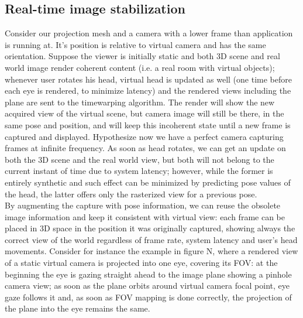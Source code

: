 \subsection{Real-time image stabilization}
Consider our projection mesh and a camera with a lower frame than application is running at. It's position is relative to virtual camera and has the same orientation. Suppose the viewer is initially static and both 3D scene and real world image render coherent content (i.e. a real room with virtual objects); whenever user rotates his head, virtual head is updated as well (one time before each eye is rendered, to minimize latency) and the rendered views including the plane are sent to the timewarping algorithm. The render will show the new acquired view of the virtual scene, but camera image will still be there, in the same pose and position, and will keep this incoherent state until a new frame is captured and displayed. Hypothesize now we have a perfect camera capturing frames at infinite frequency. As soon as head rotates, we can get an update on both the 3D scene and the real world view, but both will not belong to the current instant of time due to system latency; however, while the former is entirely synthetic and such effect can be minimized by predicting pose values of the head, the latter offers only the rasterized view for a previous pose.\\
By augmenting the capture with pose information, we can reuse the obsolete image information and keep it consistent with virtual view: each frame can be placed in 3D space in the position it was originally captured, showing always the correct view of the world regardless of frame rate, system latency and user's head movements. Consider for instance the example in figure N, where a rendered view of a static virtual camera is projected into one eye, covering its FOV: at the beginning the eye is gazing straight ahead to the image plane showing a pinhole camera view; as soon as the plane orbits around virtual camera focal point, eye gaze follows it and, as soon as FOV mapping is done correctly, the projection of the plane into the eye remains the same.\\
